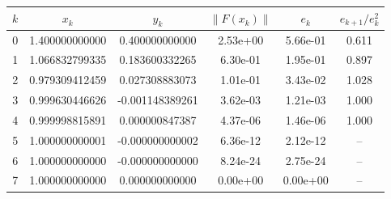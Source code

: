 \begin{tabular}{r c c c c c}
\toprule
$k$ & $x_k$ & $y_k$ & $\|F(x_k)\|$ & $e_k$ & $e_{k+1}/e_k^2$\\
\midrule
0 & 1.400000000000 & 0.400000000000 & 2.53e+00 & 5.66e-01 & 0.611\\
1 & 1.066832799335 & 0.183600332265 & 6.30e-01 & 1.95e-01 & 0.897\\
2 & 0.979309412459 & 0.027308883073 & 1.01e-01 & 3.43e-02 & 1.028\\
3 & 0.999630446626 & -0.001148389261 & 3.62e-03 & 1.21e-03 & 1.000\\
4 & 0.999998815891 & 0.000000847387 & 4.37e-06 & 1.46e-06 & 1.000\\
5 & 1.000000000001 & -0.000000000002 & 6.36e-12 & 2.12e-12 & --\\
6 & 1.000000000000 & -0.000000000000 & 8.24e-24 & 2.75e-24 & --\\
7 & 1.000000000000 & 0.000000000000 & 0.00e+00 & 0.00e+00 & --\\
\bottomrule
\end{tabular}

